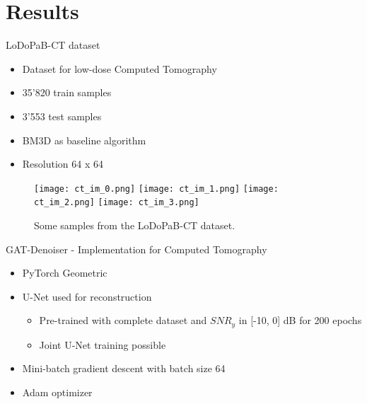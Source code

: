 
\section{Results}

\begin{frame}{LoDoPaB-CT dataset}
  \begin{itemize}
      \item Dataset for low-dose Computed Tomography
      \item 35'820 train samples
      \item 3'553 test samples
      \item BM3D as baseline algorithm
      \item Resolution 64 x 64
  \end{itemize}
  \begin{figure}
    \centering
    \hfill
    \texttt{[image: ct\_im\_0.png]}
    \hfill
    \texttt{[image: ct\_im\_1.png]}
    \hfill
    \texttt{[image: ct\_im\_2.png]}
    \hfill
    \texttt{[image: ct\_im\_3.png]}
    \hfill
    \caption{Some samples from the LoDoPaB-CT dataset.}
  \end{figure}
\end{frame}


\begin{frame}{GAT-Denoiser - Implementation for Computed Tomography}
  \begin{itemize}
    \item PyTorch Geometric
    \item U-Net used for reconstruction
    \begin{itemize}
        \item Pre-trained with complete dataset and $SNR_y$ in [-10, 0] dB for 200 epochs
        \item Joint U-Net training possible
    \end{itemize}
    \item Mini-batch gradient descent with batch size 64
    \item Adam optimizer
    
  \end{itemize}
\end{frame}




